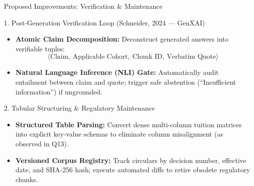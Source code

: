 \begin{frame}{Proposed Improvements: Verification \& Maintenance}
  \vspace{-0.1cm}
  \begin{block}{1. Post-Generation Verification Loop (Schneider, 2024 --- GenXAI)}
    \begin{itemize}
      \setlength{\itemsep}{0.12cm}
      \item \textbf{Atomic Claim Decomposition:} Deconstruct generated answers into verifiable tuples:
        \[
          \langle\text{Claim},\ \text{Applicable Cohort},\ \text{Chunk ID},\ \text{Verbatim Quote}\rangle
        \]
      \item \textbf{Natural Language Inference (NLI) Gate:} Automatically audit entailment between claim and quote; trigger safe abstention (``Insufficient information'') if ungrounded.
    \end{itemize}
  \end{block}

  \begin{block}{2. Tabular Structuring \& Regulatory Maintenance}
    \begin{itemize}
      \setlength{\itemsep}{0.12cm}
      \item \textbf{Structured Table Parsing:} Convert dense multi-column tuition matrices into explicit key-value schemas to eliminate column misalignment (as observed in Q13).
      \item \textbf{Versioned Corpus Registry:} Track circulars by decision number, effective date, and SHA-256 hash; execute automated diffs to retire obsolete regulatory chunks.
    \end{itemize}
  \end{block}

\end{frame}
